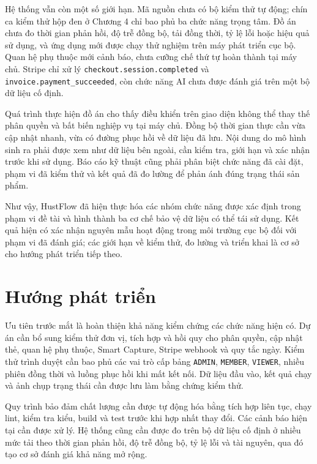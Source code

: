 \documentclass[../DoAn.tex]{subfiles}
\begin{document}
Hệ thống vẫn còn một số giới hạn. Mã nguồn chưa có bộ kiểm thử tự động; chín ca kiểm thử hộp đen ở Chương 4 chỉ bao phủ ba chức năng trọng tâm. Đồ án chưa đo thời gian phản hồi, độ trễ đồng bộ, tải đồng thời, tỷ lệ lỗi hoặc hiệu quả sử dụng, và ứng dụng mới được chạy thử nghiệm trên máy phát triển cục bộ. Quan hệ phụ thuộc mới cảnh báo, chưa cưỡng chế thứ tự hoàn thành tại máy chủ. Stripe chỉ xử lý \texttt{checkout.session.completed} và \texttt{invoice.payment\_succeeded}, còn chức năng AI chưa được đánh giá trên một bộ dữ liệu cố định.

Quá trình thực hiện đồ án cho thấy điều khiển trên giao diện không thể thay thế phân quyền và bất biến nghiệp vụ tại máy chủ. Đồng bộ thời gian thực cần vừa cập nhật nhanh, vừa có đường phục hồi về dữ liệu đã lưu. Nội dung do mô hình sinh ra phải được xem như dữ liệu bên ngoài, cần kiểm tra, giới hạn và xác nhận trước khi sử dụng. Báo cáo kỹ thuật cũng phải phân biệt chức năng đã cài đặt, phạm vi đã kiểm thử và kết quả đã đo lường để phản ánh đúng trạng thái sản phẩm.

Như vậy, HustFlow đã hiện thực hóa các nhóm chức năng được xác định trong phạm vi đề tài và hình thành ba cơ chế bảo vệ dữ liệu có thể tái sử dụng. Kết quả hiện có xác nhận nguyên mẫu hoạt động trong môi trường cục bộ đối với phạm vi đã đánh giá; các giới hạn về kiểm thử, đo lường và triển khai là cơ sở cho hướng phát triển tiếp theo.

\section{Hướng phát triển}
\label{section:6.2}

Ưu tiên trước mắt là hoàn thiện khả năng kiểm chứng các chức năng hiện có. Dự án cần bổ sung kiểm thử đơn vị, tích hợp và hồi quy cho phân quyền, cập nhật thẻ, quan hệ phụ thuộc, Smart Capture, Stripe webhook và quy tắc ngày. Kiểm thử trình duyệt cần bao phủ các vai trò cấp bảng \texttt{ADMIN}, \texttt{MEMBER}, \texttt{VIEWER}, nhiều phiên đồng thời và luồng phục hồi khi mất kết nối. Dữ liệu đầu vào, kết quả chạy và ảnh chụp trạng thái cần được lưu làm bằng chứng kiểm thử.

Quy trình bảo đảm chất lượng cần được tự động hóa bằng tích hợp liên tục, chạy lint, kiểm tra kiểu, build và test trước khi hợp nhất thay đổi. Các cảnh báo hiện tại cần được xử lý. Hệ thống cũng cần được đo trên bộ dữ liệu cố định ở nhiều mức tải theo thời gian phản hồi, độ trễ đồng bộ, tỷ lệ lỗi và tài nguyên, qua đó tạo cơ sở đánh giá khả năng mở rộng.
\end{document}
